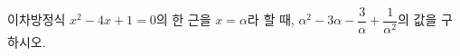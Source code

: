 이차방정식 $x^2-4x+1=0$의 한 근을 $x=\alpha$라 할 때, $\alpha^2-3\alpha-\dfrac{3}{\alpha}+\dfrac{1}{\alpha^2}$의 값을 구하시오.

